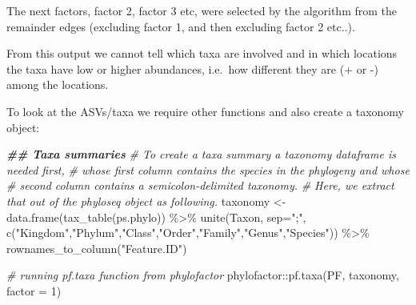 \documentclass[
]{book}
\newenvironment{Shaded}{\begin{snugshade}}{\end{snugshade}}
\newcommand{\AttributeTok}[1]{\textcolor[rgb]{0.77,0.63,0.00}{#1}}
\newcommand{\CommentTok}[1]{\textcolor[rgb]{0.56,0.35,0.01}{\textit{#1}}}
\newcommand{\DecValTok}[1]{\textcolor[rgb]{0.00,0.00,0.81}{#1}}
\newcommand{\DocumentationTok}[1]{\textcolor[rgb]{0.56,0.35,0.01}{\textbf{\textit{#1}}}}
\newcommand{\FunctionTok}[1]{\textcolor[rgb]{0.00,0.00,0.00}{#1}}
\newcommand{\NormalTok}[1]{#1}
\newcommand{\OtherTok}[1]{\textcolor[rgb]{0.56,0.35,0.01}{#1}}
\newcommand{\SpecialCharTok}[1]{\textcolor[rgb]{0.00,0.00,0.00}{#1}}
\newcommand{\StringTok}[1]{\textcolor[rgb]{0.31,0.60,0.02}{#1}}
\begin{document}
The next factors, factor 2, factor 3 etc, were selected by the algorithm from the remainder edges (excluding factor 1, and then excluding factor 2 etc..).

From this output we cannot tell which taxa are involved and in which locations the taxa have low or higher abundances, i.e.~how different they are (+ or -) among the locations.

To look at the ASVs/taxa we require other functions and also create a taxonomy object:

\begin{Shaded}
\begin{Highlighting}[]
\DocumentationTok{\#\# Taxa summaries}
\CommentTok{\# To create a taxa summary a taxonomy dataframe is needed first, }
\CommentTok{\# whose first column contains the species in the phylogeny and whose}
\CommentTok{\# second column contains a semicolon{-}delimited taxonomy. }
\CommentTok{\# Here, we extract that out of the phyloseq object as following.}
\NormalTok{taxonomy }\OtherTok{\textless{}{-}} \FunctionTok{data.frame}\NormalTok{(}\FunctionTok{tax\_table}\NormalTok{(ps.phylo)) }\SpecialCharTok{\%\textgreater{}\%}
  \FunctionTok{unite}\NormalTok{(Taxon, }\AttributeTok{sep=}\StringTok{";"}\NormalTok{, }\FunctionTok{c}\NormalTok{(}\StringTok{"Kingdom"}\NormalTok{,}\StringTok{"Phylum"}\NormalTok{,}\StringTok{"Class"}\NormalTok{,}\StringTok{"Order"}\NormalTok{,}\StringTok{"Family"}\NormalTok{,}\StringTok{"Genus"}\NormalTok{,}\StringTok{"Species"}\NormalTok{))  }\SpecialCharTok{\%\textgreater{}\%}
  \FunctionTok{rownames\_to\_column}\NormalTok{(}\StringTok{"Feature.ID"}\NormalTok{)  }
 
\CommentTok{\# running pf.taxa function from phylofactor}
\NormalTok{phylofactor}\SpecialCharTok{::}\FunctionTok{pf.taxa}\NormalTok{(PF, taxonomy, }\AttributeTok{factor =} \DecValTok{1}\NormalTok{)}
\end{Highlighting}
\end{Shaded}
\end{document}
